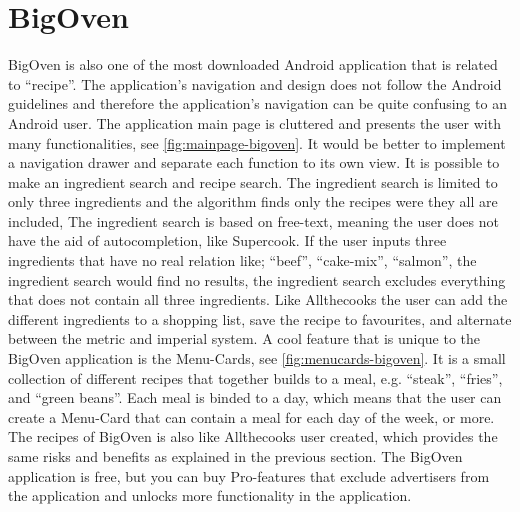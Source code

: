 \section{BigOven}
BigOven is also one of the most downloaded \cite{bigoven-googleplay} Android application that is related to ``recipe''. The application's navigation and design does not follow the Android guidelines\cite{guidelines-appstructure} and therefore the application's navigation can be quite confusing to an Android user.
The application main page is cluttered and presents the user with many functionalities, see \autoref{fig:mainpage-bigoven}. It would be better to implement a navigation drawer and separate each function to its own view. 
It is possible to make an ingredient search and recipe search. The ingredient search is limited to only three ingredients and the algorithm finds only the recipes were they all are included, The ingredient search is based on free-text, meaning the user does not have the aid of autocompletion, like Supercook. If the user inputs three ingredients that have no real relation like; ``beef'', ``cake-mix'', ``salmon'', the ingredient search would find no results, the ingredient search excludes everything that does not contain all three ingredients.
Like Allthecooks the user can add the different ingredients to a shopping list, save the recipe to favourites, and alternate between the metric and imperial system.
A cool feature that is unique to the BigOven application is the Menu-Cards, see \autoref{fig:menucards-bigoven}.
It is a small collection of different recipes that together builds to a meal, e.g. ``steak'', ``fries'', and ``green beans''. Each meal is binded to a day, which means that the user can create a Menu-Card that can contain a meal for each day of the week, or more.
The recipes of BigOven is also like Allthecooks user created, which provides the same risks and benefits as explained in the previous section.
The BigOven application is free, but you can buy Pro-features that exclude advertisers from the application and unlocks more functionality in the application.

